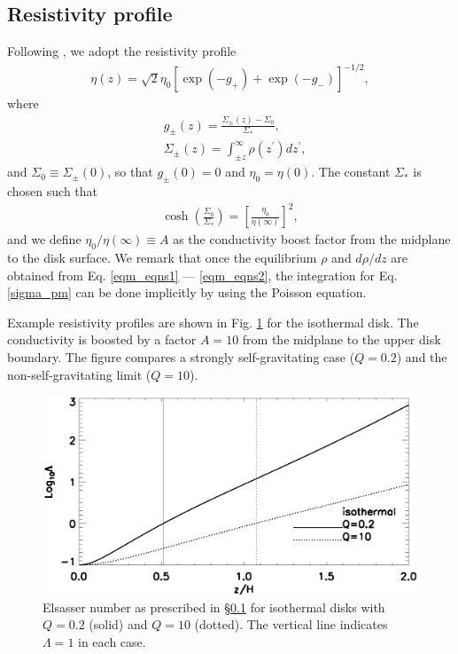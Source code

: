 \subsection{Resistivity profile}\label{resis_profile}
Following \cite{fleming03}, we adopt the resistivity profile
\begin{align}
  \eta(z) =
  \sqrt{2}\eta_0\left[\exp{\left(-g_+\right)}+\exp{\left(-g_-\right)}\right]^{-1/2},  
\end{align}
where
\begin{align}
  &g_\pm(z) =  \frac{\Sigma_\pm(z)-\Sigma_0}{\Sigma_*}, \\
  &\Sigma_\pm(z) = \int_{\pm z}^\infty\rho(z^\prime)dz^\prime, \label{sigma_pm}
\end{align}
and $\Sigma_0\equiv\Sigma_{\pm}(0)$, so that $g_\pm(0)=0$ and $\eta_0 
= \eta(0)$. The constant $\Sigma_*$ is chosen such that 
\begin{align}
  \cosh{\left(\frac{\Sigma_0}{\Sigma_*}\right)} =
  \left[\frac{\eta_0}{\eta(\infty)}\right]^2,
\end{align}
and we define $\eta_0/\eta(\infty)\equiv A$ as the conductivity
boost factor from the midplane to the disk surface. We remark that
once the equilibrium $\rho$ and $d\rho/dz$ are obtained from
Eq. \ref{eqm_eqns1} --- \ref{eqm_eqns2}, the integration for
Eq. \ref{sigma_pm} can be done implicitly by using the Poisson
equation. 

Example resistivity profiles are shown in Fig. \ref{eqm_resis} for the isothermal disk. 
The conductivity is boosted by a factor $A=10$ from the midplane to
the upper disk boundary. The figure compares a strongly self-gravitating case
($Q=0.2$) and the non-self-gravitating limit ($Q=10$). 


\begin{figure}
  \includegraphics[width=\linewidth]{figures/elsasser_iso}
  \caption{Elsasser number as prescribed in \S\ref{resis_profile} for
    isothermal disks with $Q=0.2$ (solid) 
    and $Q=10$ (dotted). The vertical line
    indicates $\Lambda=1$ in each case. \label{eqm_resis}}
\end{figure}




